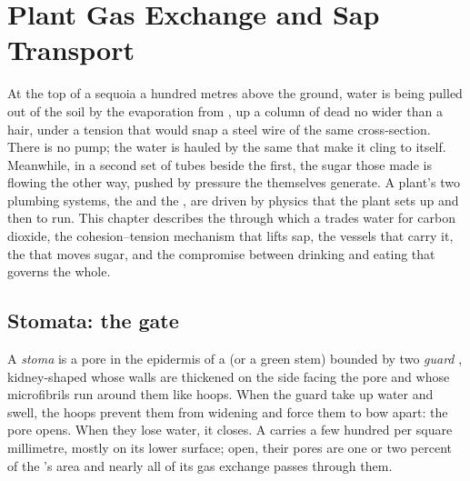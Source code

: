 \chapter{Plant Gas Exchange and Sap Transport}\label{ch:b1:plant-transport}

At the top of a sequoia a hundred metres above the ground, water is
being pulled out of the soil by the evaporation from , up a
column of dead  no wider than a hair, under a tension that would
snap a steel wire of the same cross-section. There is no pump; the
water is hauled by the same  that make it cling to
itself. Meanwhile, in a second set of tubes beside the first, the
sugar those  made is flowing the other way, pushed by pressure
the  themselves generate. A plant's two plumbing systems, the
 and the , are driven by physics that the plant sets up and
then  to run. This chapter describes the  through which
a  trades water for carbon dioxide, the cohesion--tension
mechanism that lifts sap, the vessels that carry it, the  that moves sugar, and the compromise between drinking and
eating that governs the whole.

\section{Stomata: the gate}

\begin{definition}\label{def:b1:plant-transport:stoma}
A \emph{stoma} is a pore in the epidermis of a  (or a green stem)
bounded by two \emph{guard }, kidney-shaped  whose walls are
thickened on the side facing the pore and whose  microfibrils
run around them like hoops. When the guard  take up water and
swell, the hoops prevent them from widening and force them to bow
apart: the pore opens. When they lose water, it closes. A  carries
a few hundred  per square millimetre, mostly on its lower
surface; open, their pores are one or two percent of the 's area
and nearly all of its gas exchange passes through them.
\end{definition}

